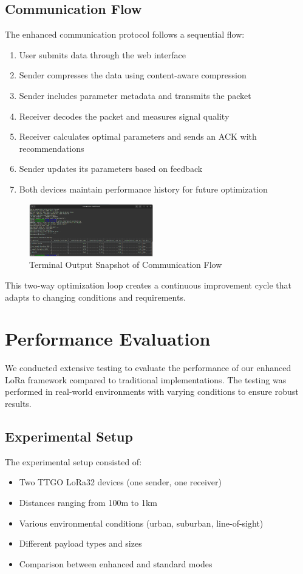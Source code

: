 \documentclass[conference]{IEEEtran}
\begin{document}
\subsection{Communication Flow}
The enhanced communication protocol follows a sequential flow:

\begin{enumerate}
    \item User submits data through the web interface
    \item Sender compresses the data using content-aware compression
    \item Sender includes parameter metadata and transmits the packet
    \item Receiver decodes the packet and measures signal quality
    \item Receiver calculates optimal parameters and sends an ACK with recommendations
    \item Sender updates its parameters based on feedback
    \item Both devices maintain performance history for future optimization
\end{enumerate}

\begin{figure}[htbp]
\centering
\includegraphics[width=0.48\textwidth]{images/terminal-output-snapshot.png}
\caption{Terminal Output Snapshot of Communication Flow}
\label{fig:terminal_output}
\end{figure}

This two-way optimization loop creates a continuous improvement cycle that adapts to changing conditions and requirements.

\section{Performance Evaluation}
We conducted extensive testing to evaluate the performance of our enhanced LoRa framework compared to traditional implementations. The testing was performed in real-world environments with varying conditions to ensure robust results.

\subsection{Experimental Setup}
The experimental setup consisted of:
\begin{itemize}
    \item Two TTGO LoRa32 devices (one sender, one receiver)
    \item Distances ranging from 100m to 1km
    \item Various environmental conditions (urban, suburban, line-of-sight)
    \item Different payload types and sizes
    \item Comparison between enhanced and standard modes
\end{itemize}
\end{document}
